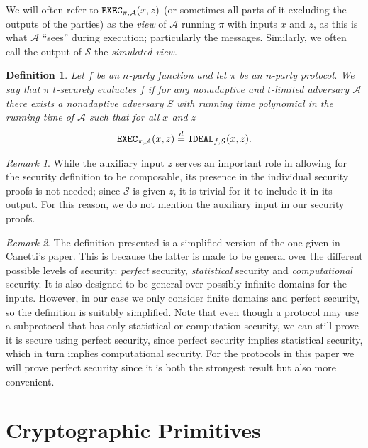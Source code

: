\documentclass{article}
\newcommand\paper{paper}
\newcommand{\eqd}[0]{\stackrel{d}{=}}
\newtheorem{definition}{Definition}
\theoremstyle{remark}
\newtheorem{remark}{Remark}
\begin{document}
We will often refer to $\textup{\texttt{EXEC}}_{\pi, \mathcal{A}} (x, z)$ (or sometimes all parts
of it excluding the outputs of the parties) as the \textit{view} of
$\mathcal{A}$ running $\pi$ with inputs $x$ and $z$, as this is what
$\mathcal{A}$ ``sees'' during execution; particularly the messages. Similarly,
we often call the output of $\mathcal{S}$ the \textit{simulated view}.

\begin{definition}\label{def:sec}
	Let $f$ be an $n$-party function and let $\pi$ be an $n$-party protocol. We
	say that $\pi$ $t$-securely evaluates $f$ if for any nonadaptive and
	$t$-limited adversary $\mathcal{A}$ there exists a nonadaptive adversary
	$S$ with running time polynomial in the running time of $\mathcal{A}$ such
	that for all $x$ and $z$
	\begin{align*}
		\exec{\pi}{\mathcal{A}}{x}{z} \eqd \ideal{f}{\mathcal{S}}{x}{z}.
	\end{align*}
\end{definition}

\begin{remark}
	While the auxiliary input $z$ serves an important role in allowing for the
	security definition to be composable, its presence in the individual
	security proofs is not needed; since $\mathcal{S}$ is given $z$, it is
	trivial for it to include it in its output. For this reason, we do not
	mention the auxiliary input in our security proofs.
\end{remark}

\begin{remark}
	The definition presented is a simplified version of the one given in
	Canetti's paper. This is because the latter is made to be general over the
	different possible levels of security: \textit{perfect} security,
	\textit{statistical} security and \textit{computational} security. It is
	also designed to be general over possibly infinite domains for the inputs.
	However, in our case we only consider finite domains and perfect security,
	so the definition is suitably simplified. Note that even though a protocol
	may use a subprotocol that has only statistical or computation security, we
	can still prove it is secure using perfect security, since perfect security
	implies statistical security, which in turn implies computational security.
	For the protocols in this \paper{} we will prove perfect security since it
	is both the strongest result but also more convenient.
\end{remark}

\section{Cryptographic Primitives}
\end{document}
